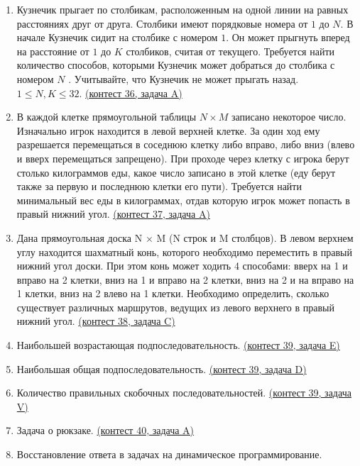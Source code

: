 \documentclass[a4paper,12pt]{article}
\begin{document}
\begin{enumerate}
\item Кузнечик прыгает по столбикам, расположенным на одной линии на равных расстояниях друг от друга. Столбики имеют порядковые номера от $1$ до $N$. В начале Кузнечик сидит на столбике с номером $1$. Он может прыгнуть вперед на расстояние от $1$ до $K$ столбиков, считая от текущего. Требуется найти количество способов, которыми Кузнечик может добраться до столбика с номером $N$ . Учитывайте, что Кузнечик не может прыгать назад. $1 \le N, K \le 32$. \href{https://informatics.msk.ru/mod/statements/view3.php?chapterid=112603}{(контест 36, задача A)}
\item В каждой клетке прямоугольной таблицы $N\times M$ записано некоторое число. Изначально игрок находится в левой верхней клетке. За один ход ему разрешается перемещаться в соседнюю клетку либо вправо, либо вниз (влево и вверх перемещаться запрещено). При проходе через клетку с игрока берут столько килограммов еды, какое число записано в этой клетке (еду берут также за первую и последнюю клетки его пути). Требуется найти минимальный вес еды в килограммах, отдав которую игрок может попасть в правый нижний угол. \href{https://informatics.msk.ru/mod/statements/view3.php?chapterid=944}{(контест 37, задача A)}
\item Дана прямоугольная доска N × M (N строк и M столбцов). В левом верхнем углу находится шахматный конь, которого необходимо переместить в правый нижний угол доски. При этом конь может ходить 4 способами: вверх на 1 и вправо на 2 клетки, вниз на 1 и вправо на 2 клетки, вниз на 2 и на вправо на 1 клетки, вниз на 2 влево на 1 клетки. Необходимо определить, сколько существует различных маршрутов, ведущих из левого верхнего в правый нижний угол. \href{https://informatics.msk.ru/mod/statements/view3.php?chapterid=2962}{(контест 38, задача C)}
\item Наибольшей возрастающая подпоследовательность. \href{https://informatics.msk.ru/mod/statements/view3.php?chapterid=205}{(контест 39, задача E)}
\item Наибольшая общая подпоследовательность. \href{https://informatics.msk.ru/mod/statements/view3.php?chapterid=204}{(контест 39, задача D)}
\item Количество правильных скобочных последовательностей. \href{https://informatics.msk.ru/mod/statements/view3.php?chapterid=3005}{(контест 39, задача V)}
\item Задача о рюкзаке. \href{https://informatics.msk.ru/mod/statements/view3.php?chapterid=3089}{(контест 40, задача A)}
\item Восстановление ответа в задачах на динамическое программирование.
\end{enumerate}
\end{document}
